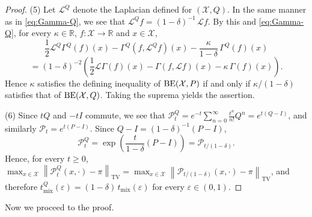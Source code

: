 \documentclass[a4paper, reqno, 11pt]{amsart}
\theoremstyle{definition}
\begin{document}
\begin{proof}
(5)
Let $\mathcal{L}^{Q}$ denote the Laplacian defined for $(\mathcal{X}, Q)$.
In the same manner as in \eqref{eq:Gamma-Q}, we see that $\mathcal{L}^{Q} f = (1-\delta)^{-1}\,\mathcal{L} f$.
By this and \eqref{eq:Gamma-Q}, for every $\kappa \in \mathbb{R}$, $f \colon \mathcal{X} \to \mathbb{R}$ and $x \in \mathcal{X}$,
\[ \frac{1}{2} \mathcal{L}^{Q}\Gamma^{Q}(f)(x) - \Gamma^{Q}(f, \mathcal{L}^{Q} f)(x) - \frac{\kappa}{1-\delta}\,\Gamma^{Q}(f)(x) \]
\[ = (1-\delta)^{-2}\left(\frac{1}{2} \mathcal{L}\Gamma(f)(x) - \Gamma(f, \mathcal{L} f)(x) - \kappa\,\Gamma(f)(x)\right). \]
Hence $\kappa$ satisfies the defining inequality of $\textup{BE}(\mathcal{X}, P)$ if and only if $\kappa/(1-\delta)$ satisfies that of $\textup{BE}(\mathcal{X}, Q)$.
Taking the suprema yields the assertion.

(6)
Since $tQ$ and $-tI$ commute, we see that
$\mathscr{P}_t^{Q} = e^{-t}\sum_{n=0}^{\infty} \frac{t^n}{n!} Q^n = e^{t(Q - I)}$, and similarly $\mathscr{P}_t = e^{t(P-I)}$.
Since $Q - I = (1-\delta)^{-1}(P - I)$,
\[ \mathscr{P}_t^{Q} = \exp\left(\frac{t}{1-\delta}\left(P - I\right)\right) = \mathscr{P}_{t/(1-\delta)}. \]
Hence, for every $t \ge 0$,
$\max_{x \in \mathcal{X}}\left\|\mathscr{P}_t^{Q}(x, \cdot) - \pi\right\|_{\mathrm{TV}} = \max_{x \in \mathcal{X}}\left\|\mathscr{P}_{t/(1-\delta)}(x, \cdot) - \pi\right\|_{\mathrm{TV}}$,
and therefore $t_{\mathrm{mix}}^{Q}(\varepsilon) = (1-\delta)\,t_{\mathrm{mix}}(\varepsilon)$ for every $\varepsilon \in (0,1)$.
\end{proof}

Now we proceed to the proof. 
\end{document}
